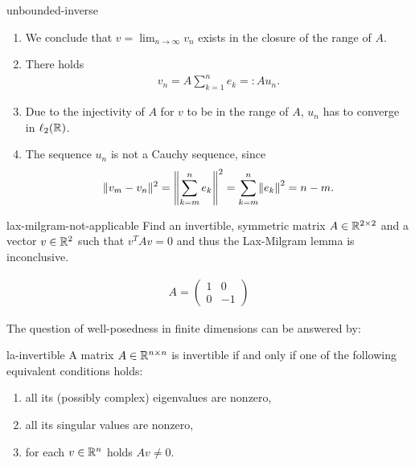 \begin{Problem}{unbounded-inverse}
\begin{solution}
\begin{enumerate}
\begin{enumerate}
      \item We conclude that $v=\lim_{n\to\infty}v_n$ exists in the
        closure of the range of $A$.
      \item There holds
        \begin{gather*}
          v_n = A \sum_{k=1}^n e_k =: A u_n.
        \end{gather*}
      \item Due to the injectivity of $A$ for $v$ to be in the range of $A$,
            $u_n$ has to converge in $\ell_2(\mathbb R)$.
      \item The sequence $u_n$ is not a Cauchy sequence, since
        \begin{gather*}
          \norm{v_m-v_n}^2 = \norm*{\sum_{k=m}^n e_k}^2
          = \sum_{k=m}^n \norm*{e_k}^2
          = n-m.
        \end{gather*}
    \end{enumerate}
  \end{enumerate}
\end{solution}
\end{Problem}

\begin{Problem}{lax-milgram-not-applicable}
  Find an invertible, symmetric matrix $A\in \mathbb R^{2\times 2}$ and a
  vector $v\in \mathbb R^2$ such that $v^T A v=0$ and thus the Lax-Milgram
  lemma is inconclusive.
\begin{solution}
  \begin{gather*}
    A =
    \begin{pmatrix}
      1 & 0 \\ 0 & -1
    \end{pmatrix}
  \end{gather*}
\end{solution}
\end{Problem}

The question of well-posedness in finite dimensions can be answered by:

\begin{Theorem}{la-invertible}
  A matrix $A\in\mathbb R^{n\times n}$ is invertible if and only if one of
  the following equivalent conditions holds:
  \begin{enumerate}
  \item all its (possibly complex) eigenvalues are nonzero,
  \item all its singular values are nonzero,
  \item for each $v\in\mathbb R^n$ holds $Av\neq 0$.
  \end{enumerate}
\end{Theorem}

